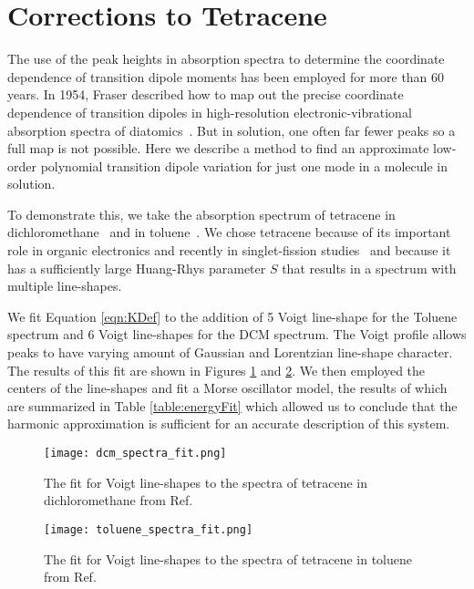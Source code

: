 \section{Corrections to Tetracene}
The use of the peak heights in absorption spectra to determine the coordinate dependence of transition dipole moments has been employed for more than 60 years.  In 1954, Fraser described how to map out the precise coordinate dependence of transition dipoles in high-resolution electronic-vibrational absorption spectra of diatomics~\cite{FraserFindingNCM}.  But in solution, one often far fewer peaks so a full map is not possible.  Here we describe a method to find an approximate low-order polynomial transition dipole variation for just one mode in a molecule in solution.

To demonstrate this, we take the absorption spectrum of tetracene in dichloromethane~\cite{TetraceneDichloromethane} and in toluene~\cite{TetraceneToluene}.  We chose tetracene because of its important role in organic electronics and recently in singlet-fission studies~\cite{singletFissionVibration} and because it has a sufficiently large Huang-Rhys parameter $S$ that results in a spectrum with multiple line-shapes.

We fit Equation \ref{eqn:KDef} to the addition of 5 Voigt line-shape for the Toluene spectrum and 6 Voigt line-shapes for the DCM spectrum.  The Voigt profile allows peaks to have varying amount of Gaussian and Lorentzian line-shape character.  The results of this fit are shown in Figures \ref{fig:dcm_fit} and \ref{fig:toluene_fit}.  We then employed the centers of the line-shapes and fit a Morse oscillator model, the results of which are summarized in Table \ref{table:energyFit} which allowed us to conclude that the harmonic approximation is sufficient for an accurate description of this system.

\begin{figure}
   \texttt{[image: dcm\_spectra\_fit.png]}
   \caption{The fit for Voigt line-shapes to the spectra of tetracene in dichloromethane from Ref. ~\cite{TetraceneDichloromethane}}
	\label{fig:dcm_fit}
\end{figure}

\begin{figure}
   \texttt{[image: toluene\_spectra\_fit.png]}
   \caption{The fit for Voigt line-shapes to the spectra of tetracene in toluene from Ref.~\cite{TetraceneToluene}}
	\label{fig:toluene_fit}
\end{figure}

